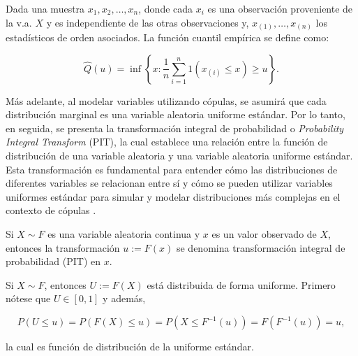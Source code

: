 \begin{defn}
    Dada una muestra $x_1, x_2, \dots, x_n$, donde cada $x_i$ es una observación proveniente de la v.a. $X$ y es independiente de las otras observaciones y, $x_{(1)}, \dots, x_{(n)}$ los estadísticos de orden asociados. La función cuantil empírica se define como:

    \begin{equation}
        \widehat{Q}(u) =  \inf \left\{ x: \frac{1}{n}\sum _{i = 1}^{n}  1(x_{(i)} \leq x) \geq u\right\}. 
    \end{equation}
\end{defn}

Más adelante, al modelar variables utilizando cópulas, se asumirá que cada distribución marginal es una variable aleatoria uniforme estándar. Por lo tanto, en seguida, se presenta la transformación integral de probabilidad o \textit{Probability Integral Transform} (PIT), la cual establece una relación entre la función de distribución de una variable aleatoria y una variable aleatoria uniforme estándar. Esta transformación es fundamental para entender cómo las distribuciones de diferentes variables se relacionan entre sí y cómo se pueden utilizar variables uniformes estándar para simular y modelar distribuciones más complejas en el contexto de cópulas \cite{CopulasR}.

\begin{defn}\label{PITdef}
    Si $X \sim F$ es una variable aleatoria continua y $x$ es un valor observado de $X$, entonces la transformación $u := F(x)$ se denomina transformación integral de probabilidad (PIT) en $x$.
\end{defn}

\begin{obs}\label{PITdist}
    Si $X \sim F$, entonces $U := F(X)$ está distribuida de forma uniforme. Primero nótese que $U \in [0, 1]$ y además, 

    \begin{equation}
        P(U \leq u)=P(F(X) \leq u)=P\left(X \leq F^{-1}(u)\right)=F\left(F^{-1}(u)\right)=u,
    \end{equation}

    la cual es función de distribución de la uniforme estándar.
\end{obs}



